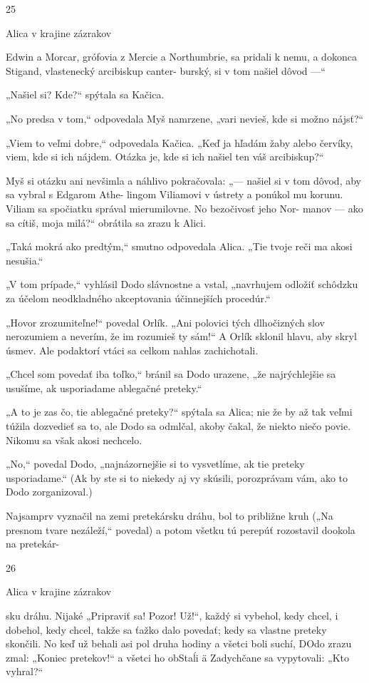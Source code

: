 \documentclass[12pt]{book}
\begin{document}
\begin{Parallel}[p]{}{}
{25

Alica v krajine zázrakov

Edwin a Morcar, grófovia z Mercie a Northumbrie, sa pridali
k nemu, a dokonca Stigand, vlastenecký arcibiskup canter-
burský, si v tom našiel dôvod —“

„Našiel si? Kde?“ spýtala sa Kačica.

„No predsa v tom,“ odpovedala Myš namrzene, „vari
nevieš, kde si možno nájsť?“

„Viem to veľmi dobre,“ odpovedala Kačica. „Keď ja
hľadám žaby alebo červíky, viem, kde si ich nájdem. Otázka
je, kde si ich našiel ten váš arcibiskup?“

Myš si otázku ani nevšimla a náhlivo pokračovala:
„— našiel si v tom dôvod, aby sa vybral s Edgarom Athe-
lingom Viliamovi v ústrety a ponúkol mu korunu. Viliam sa
spočiatku správal mierumilovne. No bezočivosť jeho Nor-
manov — ako sa cítiš, moja milá?“ obrátila sa zrazu k Alici.

„Taká mokrá ako predtým,“ smutno odpovedala Alica.
„Tie tvoje reči ma akosi nesušia.“

„V tom prípade,“ vyhlásil Dodo slávnostne a vstal,
„navrhujem odložiť schôdzku za účelom neodkladného
akceptovania účinnejších procedúr.“

„Hovor zrozumiteľne!“ povedal Orlík. „Ani polovici tých
dlhočizných slov nerozumiem a neverím, že im rozumieš ty
sám!“ A Orlík sklonil hlavu, aby skryl úsmev. Ale podaktorí
vtáci sa celkom nahlas zachichotali.

„Chcel som povedať iba toľko,“ bránil sa Dodo urazene,
„že najrýchlejšie sa usušíme, ak usporiadame ablegačné
preteky.“

„A to je zas čo, tie ablegačné preteky?“ spýtala sa Alica;
nie že by až tak veľmi túžila dozvedieť sa to, ale Dodo sa
odmlčal, akoby čakal, že niekto niečo povie. Nikomu sa
však akosi nechcelo.

„No,“ povedal Dodo, „najnázornejšie si to vysvetlíme,
ak tie preteky usporiadame.“ (Ak by ste si to niekedy aj
vy skúsili, porozprávam vám, ako to Dodo zorganizoval.)

Najsamprv vyznačil na zemi pretekársku dráhu, bol to
približne kruh („Na presnom tvare nezáleží,“ povedal)
a potom všetku tú perepúť rozostavil dookola na pretekár-

26

 

Alica v krajine zázrakov

sku dráhu. Nijaké „Pripraviť sa! Pozor! Už!“, každý si
vybehol, kedy chcel, i dobehol, kedy chcel, takže sa ťažko
dalo povedať; kedy sa vlastne preteky skončili. No keď už
behali asi pol druha hodiny a všetci boli suchí, DOdo zrazu
zmal: „Koniec pretekov!“ a všetci ho obStaĺi ä Zadychčane
sa vypytovali: „Kto vyhral?“

}
\end{Parallel}
\end{document}
